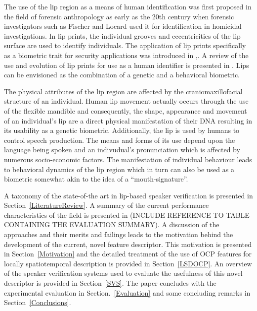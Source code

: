 \documentclass[a4paper, 10pt, conference]{ieeeconf}      %
\begin{document}
The use of the lip region as a means of human identification was first proposed in the field of forensic anthropology as early as the 20th century when forensic investigators such as Fischer and Locard \cite{Kasprzak90Poss} used it for identification in homicidal investigations. In lip prints, the individual grooves and eccentricities of the lip surface are used to identify individuals. The application of lip prints specifically as a biometric trait for security applications was introduced in \cite{Suzuki68Trail},\cite{Suzuki69Trail}. A review of the use and evolution of lip prints for use as a human identifier is presented in \cite{Maheswari05Lip}. Lips can be envisioned as the combination of a genetic and a behavioral biometric. 

The physical attributes of the lip region are affected by the craniomaxillofacial structure of an individual. Human lip movement actually occurs through the use of the flexible mandible and consequently, the shape, appearance and movement of an individual's lip are a direct physical manifestation of their DNA resulting in its usability as a genetic biometric. Additionally, the lip is used by humans to control speech production. The means and forms of its use depend upon the language being spoken and an indivudual's pronunciation which is affected by numerous socio-economic factors. The manifestation of individual behaviour leads to behavioral dynamics of the lip region which in turn can also be used as a biometric somewhat akin to the idea of a ``mouth-signature''. 


A taxonomy of the state-of-the art in lip-based speaker verification is presented in Section~\ref{LiteratureReview}. A summary of the current performance characteristics of the field is presented in (INCLUDE REFERENCE TO TABLE CONTAINING THE EVALUATION SUMMARY). A discussion of the approaches and their merits and failings leads to the motivation behind the development of the current, novel feature descriptor. This motivation is presented in Section~\ref{Motivation} and the detailed treatment of the use of OCP features for locally spatiotemporal description is provided in Section~\ref{LSDOCP}. An overview of the speaker verification systems used to evaluate the usefulness of this novel descriptor is provided in Section~\ref{SVS}. The paper concludes with the experimental evaluation in Section.~\ref{Evaluation} and some concluding remarks in Section~\ref{Conclusions}.
\end{document}
